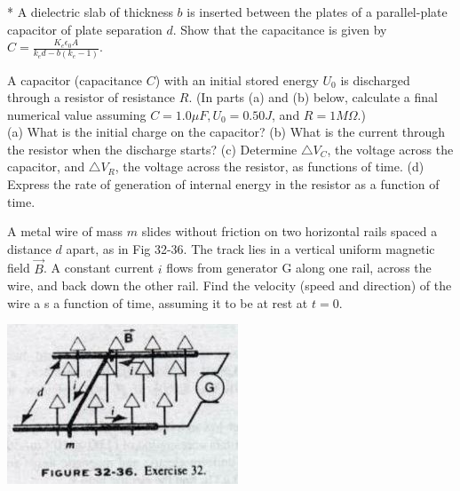 \documentclass[11pt,letterpaper,boxed]{hmcpset}
\begin{document}
	\begin{problem}* A dielectric slab of thickness $b$ is inserted between the plates of a parallel-plate capacitor of plate separation $d$. Show that the capacitance is given by $C = \frac{K_e \epsilon_0 A}{k_e d -b(k_e -1)}$.
		
	\end{problem}
	
	\begin{solution}
		\vfill
	\end{solution}
	\newpage	
	
	\begin{problem}[HRK E31.48] A capacitor (capacitance $C$) with an initial stored energy $U_0$ is discharged
through a resistor of resistance $R$. (In parts (a) and (b) below, calculate a final numerical value
assuming $C =1.0 \mu F, U_0 = 0.50 J$, and $R=1 M\Omega$.)\\
(a) What is the initial charge on the capacitor?
(b) What is the current through the resistor when the discharge starts?
(c) Determine $\bigtriangleup V_C$, the voltage across the capacitor, and $\bigtriangleup V_R$, the voltage across the resistor, as
functions of time.
(d) Express the rate of generation of internal energy in the resistor as a function of time.
	\end{problem}
	
	\begin{solution}
		\vfill
	\end{solution}
	\newpage
	
	\begin{problem}[HRK E32.32]
A metal wire of mass $m$ slides without friction on two horizontal rails spaced a distance $d$ apart, as in Fig 32-36. The track lies in a vertical uniform magnetic field $\vec{B}$. A constant current $i$ flows from generator G along one rail, across the wire, and back down the other rail. Find the velocity (speed and direction) of the wire a s a function of time, assuming it to be at rest at $t = 0$.
\begin{center}
			\includegraphics[scale=.7]{51m7pic2.jpg}
	\end{center}
		
	\end{problem}
	
\end{document}
